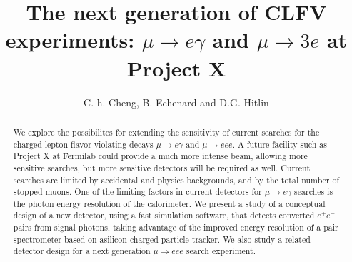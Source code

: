 \documentclass[12pt]{article}
\begin{document}

\title{The next generation of 
CLFV experiments:\break
$\mu \to e \gamma$ and  $\mu \to 3e$ at Project X}

\author{C.-h. Cheng, B. Echenard and D.G. Hitlin}

\maketitle

\begin{abstract}
We explore the possibilites for extending the sensitivity of current searches for the charged lepton flavor violating decays $\mu\to e \gamma$ and  $\mu\to eee$.  A future facility such as Project X at 
Fermilab could provide a much more intense beam, allowing more sensitive searches, but more
sensitive detectors will be required as well. Current searches are limited by accidental and physics backgrounds, and by the total number of stopped muons. One of the limiting factors in current detectors
for $\mu \to e \gamma$ searches is the photon energy resolution of the calorimeter. We present a study of a
conceptual design of a new detector, using a fast simulation software, that
detects converted $e^+e^-$ pairs from signal photons, taking advantage of the  improved
energy resolution of a pair spectrometer based on asilicon charged particle tracker.  We also study
a related detector design for a next generation $\mu\to eee$ search experiment.
\end{abstract}








\end{document}
